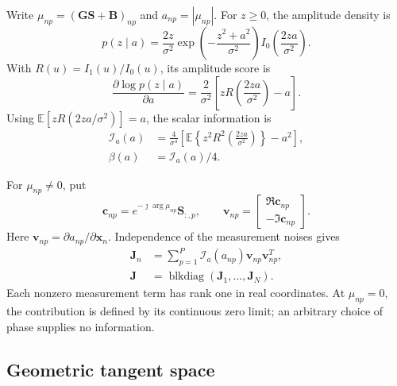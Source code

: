\documentclass[journal]{IEEEtran}
\begin{document}
Write $\mu_{np}=(\mathbf G\mathbf S+\mathbf B)_{np}$ and
$a_{np}=|\mu_{np}|$. For $z\geq0$, the amplitude density is
\begin{equation}
p(z\mid a)=\frac{2z}{\sigma^2}
 \exp\!\left(-\frac{z^2+a^2}{\sigma^2}\right)
 I_0\!\left(\frac{2za}{\sigma^2}\right).
\end{equation}
With $R(u)=I_1(u)/I_0(u)$, its amplitude score is
\begin{equation}
\frac{\partial\log p(z\mid a)}{\partial a}
=\frac{2}{\sigma^2}
 \left[zR\!\left(\frac{2za}{\sigma^2}\right)-a\right].
\end{equation}
Using $\mathbb E[zR(2za/\sigma^2)]=a$, the scalar information is
\begin{align}
\mathcal I_a(a)
&=\frac{4}{\sigma^4}
 \left[\mathbb E\!\left\{z^2R^2\!\left(\frac{2za}{\sigma^2}\right)\right\}
 -a^2\right],
\label{eq:revision-scalar-information}\\
\beta(a)&=\mathcal I_a(a)/4.
\end{align}

For $\mu_{np}\ne0$, put
\begin{equation}
\mathbf c_{np}=e^{-\jmath\arg\mu_{np}}\mathbf S_{:,p},
\qquad
\mathbf v_{np}=
\begin{bmatrix}\Re\mathbf c_{np}\\-\Im\mathbf c_{np}\end{bmatrix}.
\end{equation}
Here $\mathbf v_{np}=\partial a_{np}/\partial\mathbf x_n$.
Independence of the measurement noises gives
\begin{align}
\mathbf J_n&=\sum_{p=1}^{P}
  \mathcal I_a(a_{np})\mathbf v_{np}\mathbf v_{np}^T,\\
\mathbf J&=\operatorname{blkdiag}
 (\mathbf J_1,\ldots,\mathbf J_N).
\label{eq:revision-real-fisher}
\end{align}
Each nonzero measurement term has rank one in real coordinates. At
$\mu_{np}=0$, the contribution is defined by its continuous zero limit;
an arbitrary choice of phase supplies no information.

\subsection{Geometric tangent space}
\end{document}
